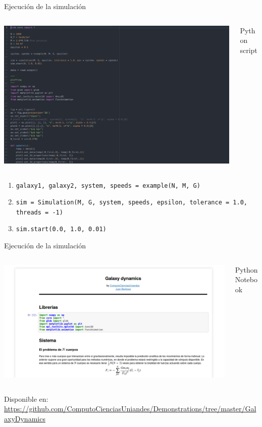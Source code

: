\documentclass{beamer}
\begin{document}
\begin{frame}{Ejecuci\'on de la simulaci\'on}
	\begin{columns}
		\begin{column}{0.75\textwidth}
			\includegraphics[height=0.5\textheight]{sources/images/code.png}
		\end{column}
		\begin{column}{0.25\textwidth}
			Python script
		\end{column}
	\end{columns}
	\footnotesize
	\begin{enumerate}
		\item \texttt{galaxy1, galaxy2, system, speeds = example(N, M, G)} \pause
		\item \texttt{sim = Simulation(M, G, system, speeds, epsilon, tolerance = 1.0, threads = -1)} \pause
		\item \texttt{sim.start(0.0, 1.0, 0.01)}
	\end{enumerate}
\end{frame}
\begin{frame}{Ejecuci\'on de la simulaci\'on}
	\begin{columns}
		\begin{column}{0.75\textwidth}
			\includegraphics[height=0.5\textheight]{sources/images/screen.png}
		\end{column}
		\begin{column}{0.25\textwidth}
			Python Notebook
		\end{column}
	\end{columns}
	Disponible en:
	\tiny
	\url{https://github.com/ComputoCienciasUniandes/Demonstrations/tree/master/GalaxyDynamics}
	\normalsize
\end{frame}
\end{document}
